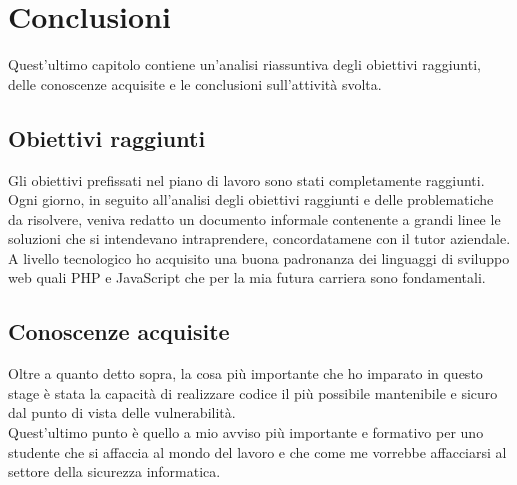 
\chapter{Conclusioni}
\label{cap:conclusioni}
Quest'ultimo capitolo contiene un'analisi riassuntiva degli obiettivi raggiunti, delle conoscenze acquisite e le conclusioni sull'attività svolta.
\section{Obiettivi raggiunti}
Gli obiettivi prefissati nel piano di lavoro sono stati completamente raggiunti. Ogni giorno, in seguito all'analisi degli obiettivi raggiunti e delle problematiche da risolvere, veniva redatto un documento informale contenente a grandi linee le soluzioni che si intendevano intraprendere, concordatamene con il tutor aziendale.
\\
A livello tecnologico ho acquisito una buona padronanza dei linguaggi di sviluppo web quali PHP e JavaScript che per la mia futura carriera sono fondamentali. 

\section{Conoscenze acquisite}
Oltre a quanto detto sopra, la cosa più importante che ho imparato in questo stage è stata la capacità di realizzare codice il più possibile mantenibile e sicuro dal punto di vista delle vulnerabilità.
\\ 
Quest'ultimo punto è quello a mio avviso più importante e formativo per uno studente che si affaccia al mondo del lavoro e che come me vorrebbe affacciarsi al settore della sicurezza informatica.
